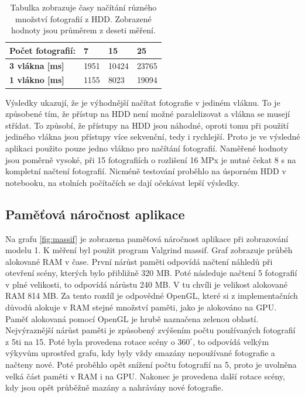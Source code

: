\documentclass[11pt,twoside,a4paper]{book}
\begin{document}
\begin{table}[ht]
\begin{center}
%
\begin{tabularx}{\textwidth}{ |l|R|R|R| }
\hline
\textbf{Počet fotografií:}  & \textbf{7} & \textbf{15} & \textbf{25} \\ \hline
\textbf{3 vlákna [ms]} & 1951 & 10424 & 23765  \\ \hline
\textbf{1 vlákno  [ms]} & 1155 & 8023 & 19094  \\ \hline
\end{tabularx}
\caption{Tabulka zobrazuje časy načítání různého množství fotografií z HDD. Zobrazené hodnoty jsou průměrem z deseti měření.}
\label{tab:test-6}
\end{center}
\end{table}

Výsledky ukazují, že je výhodnější načítat fotografie v jediném vláknu. To je způsobené tím, že přístup na HDD není možné paralelizovat a vlákna se musejí střídat. To způsobí, že přístupy na HDD jsou náhodné, oproti tomu při použití jediného vlákna jsou přístupy více sekvenční, tedy i rychlejší. Proto je ve výsledné aplikaci použito pouze jedno vlákno pro načítání fotografií. Naměřené hodnoty jsou poměrně vysoké, při 15 fotografiích o rozlišení 16 MPx je nutné čekat 8 s na kompletní načtení fotografií. Nicméně testování proběhlo na úsporném HDD v notebooku, na stolních počítačích se dají očekávat lepší výsledky.


\subsection{Paměťová náročnost aplikace}

Na grafu \ref{fig:massif} je zobrazena paměťová náročnost aplikace při zobrazování modelu 1. K měření byl použit program Valgrind massif. Graf zobrazuje průběh alokované RAM v čase. První nárůst paměti odpovídá načtení náhledů při otevření scény, kterých bylo přibližně 320 MB. Poté následuje načtení 5 fotografií v plné velikosti, to odpovídá nárůstu 240 MB. V tu chvíli je velikost alokované RAM 814 MB. Za tento rozdíl je odpovědné OpenGL, které si z implementačních důvodů alokuje v RAM stejné množství paměti, jako je alokováno na GPU. Paměť alokovaná pomocí OpenGL je hrubě naznačena zelenou oblastí. Nejvýraznější nárůst paměti je způsobený zvýšením počtu používaných fotografií z 5ti na 15. Poté byla provedena rotace scény o $360^{\circ}$, to odpovídá velkým výkyvům uprostřed grafu, kdy byly vždy smazány nepoužívané fotografie a načteny nové. Poté proběhlo opět snížení počtu fotografií na 5, proto je uvolněna velká část paměti v RAM i na GPU. Nakonec je provedena další rotace scény, kdy jsou opět průběžně mazány a nahrávány nové fotografie.
\end{document}
